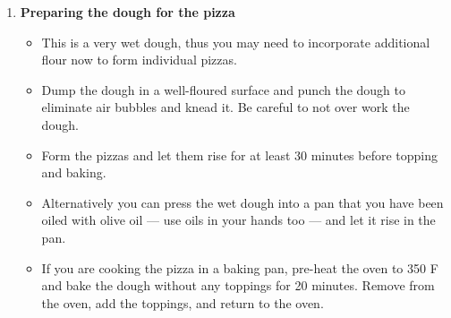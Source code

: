 \documentclass [11pt, letterpaper] {article}
\begin{document}
\begin{description}
\begin{enumerate}
	\item {\bf Preparing the dough for the pizza}
	\begin{itemize}
	\item This is a very wet dough, thus you may need to incorporate additional flour now to form individual pizzas.
	\item Dump the dough in a well-floured surface and punch the dough to eliminate air bubbles and knead it. Be careful to not over work the dough.
	\item Form the pizzas and let them rise for at least 30 minutes before topping and baking.
	\item Alternatively you can press the wet dough into a pan that you have been oiled with olive oil --- use oils in your hands too --- and let it rise in the pan.
	\item If you are cooking the pizza in a baking pan, pre-heat the oven to 350 F and bake the dough without any toppings for 20 minutes. Remove from the oven, add the toppings, and return to the oven. 
	\end{itemize}
	
	\end{enumerate}
\end{description}
\end{document}
